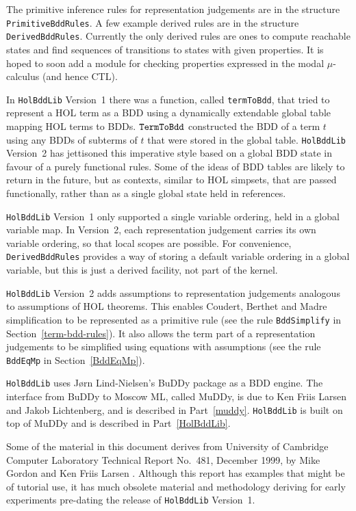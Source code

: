 \documentclass[12pt]{article}
\renewcommand{\t}[1]{\mbox{\tt #1}}
\newcommand\HOL{HOL\xspace}
\newcommand{\Buddy}{BuDDy\xspace}
\newcommand{\Muddy}{MuDDy\xspace}
\begin{document}
The primitive inference rules for representation judgements are in the structure
{\tt{PrimitiveBddRules}}. A few example derived rules are in the
structure {\tt{DerivedBddRules}}. Currently the only derived rules are
ones to compute reachable states and find sequences of transitions to
states with given properties.  It is hoped to soon add a module for
checking properties expressed in the modal $\mu$-calculus (and hence CTL).

In {\tt{HolBddLib}} Version~1 there was a function, called
{\texttt{termToBdd}}, that tried to represent a \HOL{} term as a BDD
using a dynamically extendable global table mapping \HOL{} terms to
BDDs.  $\t{TermToBdd}$ constructed the BDD of a term $t$ using any
BDDs of subterms of $t$ that were stored in the global table.
{\tt{HolBddLib}} Version~2 has jettisoned this imperative style based
on a global BDD state in favour of a purely functional rules. Some of
the ideas of BDD tables are likely to return in the future, but as
contexts, similar to HOL simpsets, that are passed functionally,
rather than as a single global state held in references.

{\tt{HolBddLib}} Version~1 only supported a single variable
ordering, held in a global variable map. In Version~2, each
representation judgement carries its own variable ordering, so that local
scopes are possible. For convenience, {\tt{DerivedBddRules}}
provides a way of storing a default variable ordering in a global
variable, but this is just a derived facility, not part of the kernel.

{\tt{HolBddLib}} Version~2 adds assumptions to representation judgements
analogous to assumptions of HOL theorems. This enables
Coudert, Berthet and Madre simplification to be represented as a primitive
rule (see the rule \t{BddSimplify} in 
Section~\ref{term-bdd-rules}). 
It also allows the term part
of a representation judgements to be simplified using equations with assumptions
(see the rule \t{BddEqMp} in Section~\ref{BddEqMp}).

{\tt HolBddLib} uses J{\o}rn Lind-Nielsen's \Buddy{} package as a BDD
engine. The interface from \Buddy{} to Moscow ML, called \Muddy, is
due to Ken Friis Larsen and Jakob Lichtenberg, and is described in Part~\ref{muddy}.
{\tt HolBddLib} is built on top of \Muddy{} and
is described in Part~\ref{HolBddLib}.

Some of the material in this document derives from University of
Cambridge Computer Laboratory Technical Report No.~481, December 1999,
by Mike Gordon and Ken Friis Larsen \cite{GordonLarsen}. Although this
report has examples that might be of tutorial use, it has much
obsolete material and methodology deriving for early experiments
pre-dating the release of {\tt HolBddLib} Version~1.
\end{document}
